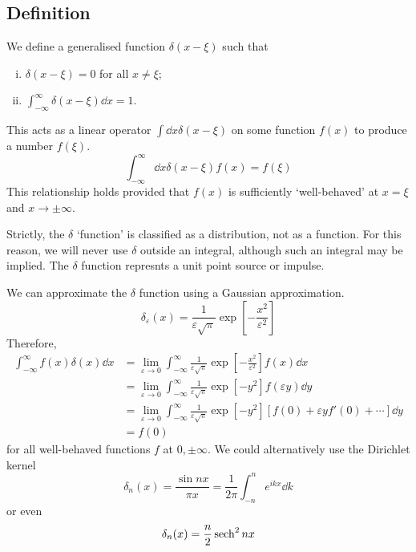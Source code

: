 \subsection{Definition}
\begin{definition}
    We define a generalised function \( \delta(x - \xi) \) such that
    \begin{enumerate}[(i)]
        \item \( \delta(x-\xi) = 0 \) for all \( x \neq \xi \);
        \item \( \int_{-\infty}^\infty \delta(x-\xi) \dd{x} = 1 \).
    \end{enumerate}
    This acts as a linear operator \( \int \dd{x} \delta(x - \xi) \) on some function \( f(x) \) to produce a number \( f(\xi) \).
    \[ \int_{-\infty}^\infty \dd{x} \delta(x-\xi) f(x) = f(\xi) \]
    This relationship holds provided that \( f(x) \) is sufficiently `well-behaved' at \( x=\xi \) and \( x\to\pm \infty \).
\end{definition}
\begin{remark}
    Strictly, the \( \delta \) `function' is classified as a distribution, not as a function.
    For this reason, we will never use \( \delta \) outside an integral, although such an integral may be implied.
    The \( \delta \) function represnts a unit point source or impulse.
\end{remark}
We can approximate the \( \delta \) function using a Gaussian approximation.
\[ \delta_\varepsilon(x) = \frac{1}{\varepsilon \sqrt{\pi}} \exp[-\frac{x^2}{\varepsilon^2}] \]
Therefore,
\begin{align*}
    \int_{-\infty}^\infty f(x) \delta(x) \dd{x} &= \lim_{\varepsilon \to 0} \int_{-\infty}^\infty \frac{1}{\varepsilon \sqrt{\pi}} \exp[-\frac{x^2}{\varepsilon^2}] f(x) \dd{x} \\
    &= \lim_{\varepsilon \to 0} \int_{-\infty}^\infty \frac{1}{\varepsilon \sqrt{\pi}} \exp[-y^2] f(\varepsilon y) \dd{y} \\
    &= \lim_{\varepsilon \to 0} \int_{-\infty}^\infty \frac{1}{\varepsilon \sqrt{\pi}} \exp[-y^2] [f(0) + \varepsilon y f'(0) + \cdots] \dd{y} \\
    &= f(0)
\end{align*}
for all well-behaved functions \( f \) at \( 0, \pm \infty \).
We could alternatively use the Dirichlet kernel
\[ \delta_n(x) = \frac{\sin n x}{\pi x} = \frac{1}{2\pi} \int_{-n}^n e^{ikx} \dd{k} \]
or even
\[ \delta_n(x) = \frac{n}{2} \sech^2 nx \]

